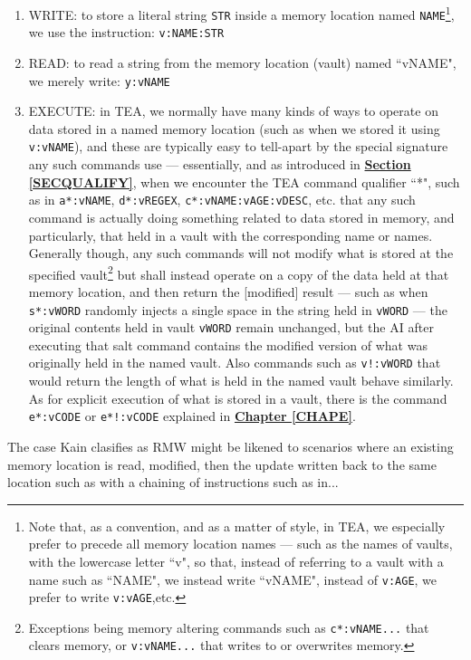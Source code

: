 \documentclass[a4paper, 18pt]{book} %
\begin{document}
{{{\begin{enumerate}
\item WRITE: to store a literal string \texttt{STR} inside a memory location named \texttt{NAME}\footnote{Note that, as a convention, and as a matter of style, in TEA, we especially prefer to precede all memory location names --- such as the names of vaults, with the lowercase letter ``v", so that, instead of referring to a vault with a name such as ``NAME", we instead write ``vNAME", instead of \texttt{v:AGE}, we prefer to write \texttt{v:vAGE},etc.}, we use the instruction: \texttt{v:NAME:STR}
\item READ: to read a string from the memory location (vault) named ``vNAME", we merely write: \texttt{y:vNAME}
\item EXECUTE: in TEA, we normally have many kinds of ways to operate on data stored in a named memory location (such as when we stored it using \texttt{v:vNAME}), and these are typically easy to tell-apart by the special signature any such commands use --- essentially, and as introduced in \textbf{\hyperref[SECQUALIFY]{Section \ref{SECQUALIFY}}}, when we encounter the TEA command qualifier ``*", such as in \texttt{a*:vNAME}, \texttt{d*:vREGEX}, \texttt{c*:vNAME:vAGE:vDESC}, etc. that any such command is actually doing something related to data stored in memory, and particularly, that held in a vault with the corresponding name or names. Generally though, any such commands will not modify what is stored at the specified vault\footnote{Exceptions being memory altering commands such as \texttt{c*:vNAME...} that clears memory, or \texttt{v:vNAME...} that writes to or overwrites memory.} but shall instead operate on a copy of the data held at that memory location, and then return the [modified] result --- such as when \texttt{s*:vWORD} randomly injects a single space in the string held in \texttt{vWORD} --- the original contents held in vault \texttt{vWORD} remain unchanged, but the AI after executing that salt command contains the modified version of what was originally held in the named vault. Also commands such as \texttt{v!:vWORD} that would return the length of what is held in the named vault behave similarly. As for explicit execution of what is stored in a vault, there is the command \texttt{e*:vCODE} or \texttt{e*!:vCODE} explained in \textbf{\hyperref[CHAPE]{Chapter \ref{CHAPE}}}.
\end{enumerate}

The case Kain clasifies as RMW might be likened to scenarios where an existing memory location is read, modified, then the update written back to the same location such as with a chaining of instructions such as in...


}}}
\end{document}
